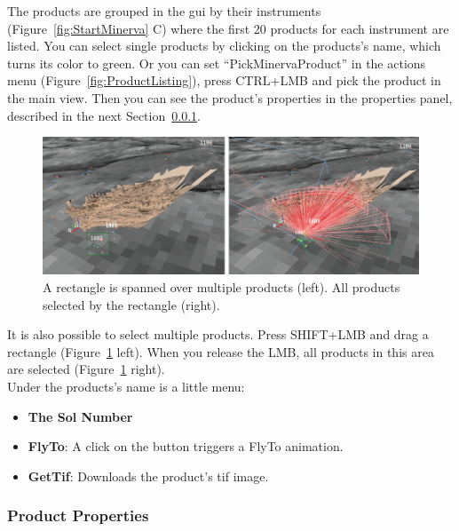 The products are grouped in the gui by their instruments (Figure~\ref{fig:StartMinerva} C) where the first 20 products for each instrument are listed.
You can select single products by clicking on the products's name, which turns its color to green. Or you can set ``PickMinervaProduct'' in the actions menu (Figure~\ref{fig:ProductListing}), press CTRL+LMB and pick the product in the main view. Then you can see the product's properties in the properties panel, described in the next Section~\ref{sec:productProps}. 

\begin{figure}[h]
				\centering
					\includegraphics[width=1\textwidth]{pics/MultiSelAI.png}
				\caption[Multi Selection]{A rectangle is spanned over multiple products (left). All products selected by the rectangle (right).}
				\label{fig:MultiSel}
		 \end{figure}
		
It is also possible to select multiple products. Press SHIFT+LMB and drag a rectangle (Figure~\ref{fig:MultiSel} left). When you release the LMB, all products in this area are selected (Figure~\ref{fig:MultiSel} right). \\
Under the products's name is a little menu:
\begin{itemize}
  \item \textbf{The Sol Number}
	\item \textbf{FlyTo}: A click on the button triggers a FlyTo animation.
	\item \textbf{GetTif}: Downloads the product's tif image.
\end{itemize}

	
	
\subsubsection{Product Properties}
\label{sec:productProps}

